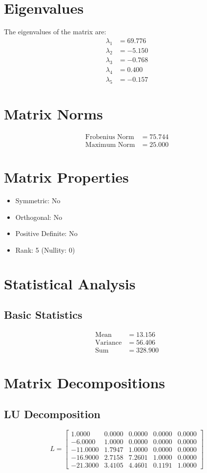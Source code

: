\documentclass{article}
\begin{document}
\section{Eigenvalues}
The eigenvalues of the matrix are:
\[
\begin{aligned}
\lambda_1 &= 69.776 \\
\lambda_2 &= -5.150 \\
\lambda_3 &= -0.768 \\
\lambda_4 &= 0.400 \\
\lambda_5 &= -0.157
\end{aligned}
\]
\section{Matrix Norms}
\begin{align*}
\text{Frobenius Norm} &= 75.744\\
\text{Maximum Norm} &= 25.000
\end{align*}

\section{Matrix Properties}
\begin{itemize}
\item Symmetric: No
\item Orthogonal: No
\item Positive Definite: No
\item Rank: 5 (Nullity: 0)
\end{itemize}

\section{Statistical Analysis}
\subsection{Basic Statistics}
\begin{align*}
\text{Mean} &= 13.156\\
\text{Variance} &= 56.406\\
\text{Sum} &= 328.900
\end{align*}

\section{Matrix Decompositions}
\subsection{LU Decomposition}
\[L
 = \begin{bmatrix}
1.0000 & 0.0000 & 0.0000 & 0.0000 & 0.0000 \\
-6.0000 & 1.0000 & 0.0000 & 0.0000 & 0.0000 \\
-11.0000 & 1.7947 & 1.0000 & 0.0000 & 0.0000 \\
-16.9000 & 2.7158 & 7.2601 & 1.0000 & 0.0000 \\
-21.3000 & 3.4105 & 4.4601 & 0.1191 & 1.0000
\end{bmatrix}
\]
\end{document}
